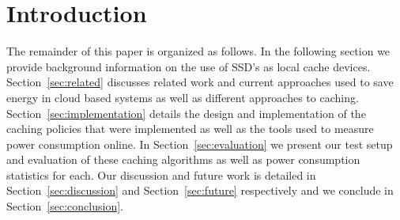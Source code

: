 \section{Introduction}

The remainder of this paper is organized as follows. In the following section we
provide background information on the use of SSD's as local cache
devices. Section~\ref{sec:related} discusses related work and current approaches
used to save energy in cloud based systems as well as different approaches to
caching. Section~\ref{sec:implementation} details the design and implementation
of the caching policies that were implemented as well as the tools used to
measure power consumption online. In Section~\ref{sec:evaluation} we present our
test setup and evaluation of these caching algorithms as well as power
consumption statistics for each. Our discussion and future work is detailed in
Section~\ref{sec:discussion} and Section~\ref{sec:future} respectively and we
conclude in Section~\ref{sec:conclusion}.
